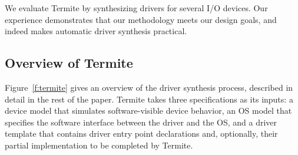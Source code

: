 \documentclass[a4paper,twoside,openright,11pt]{book}
\newcommand{\termite}{Termite\xspace}
\theoremstyle{definition}
\begin{document}
%
%
%
%    
%
%

We evaluate \termite by synthesizing drivers for several I/O devices.  Our experience demonstrates that our methodology meets our design goals, and indeed makes automatic driver synthesis practical.

\subsection{Overview of \termite} Figure~\ref{f:termite} gives an overview of the driver synthesis process, described in detail in the rest of the paper.  \termite takes three specifications as its inputs: a device model that simulates software-visible device behavior, an OS model that specifies the software interface between the driver and the OS, and a driver template that contains driver entry point declarations and, optionally, their partial implementation to be completed by \termite.
\end{document}
